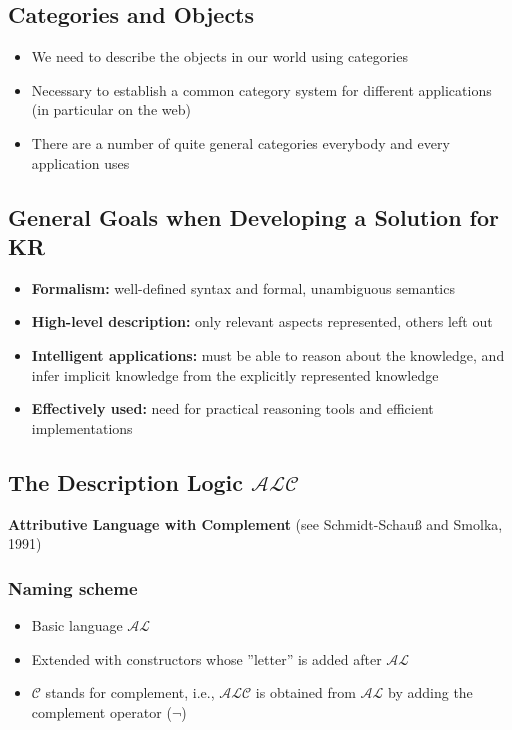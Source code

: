 \documentclass[conference, a4paper]{styles/acmsiggraph}
\begin{document}
    \subsection{Categories and Objects}
        \begin{itemize}
            \item We need to describe the objects in our world using categories
            \item Necessary to establish a common category system for different applications (in particular on the web)
            \item There are a number of quite general categories everybody and every application uses
        \end{itemize}
    
    \subsection{General Goals when Developing a Solution for KR}
        \begin{itemize}
            \item \textbf{Formalism:} well-defined syntax and formal, unambiguous semantics
            \item \textbf{High-level description:} only relevant aspects represented, others left out
            \item \textbf{Intelligent applications:} must be able to reason about the knowledge, and infer implicit knowledge from the explicitly represented knowledge
            \item \textbf{Effectively used:} need for practical reasoning tools and efficient implementations
        \end{itemize}
    
    
    
    
    
    
    \subsection{The Description Logic $\mathcal{ALC}$}
        \textbf{Attributive Language with Complement} (see Schmidt-Schauß and Smolka, 1991)
        \subsubsection{Naming scheme}
            \begin{itemize}
                \item Basic language $\mathcal{AL}$
                \item Extended with constructors whose ''letter'' is added after $\mathcal{AL}$
                \item $\mathcal{C}$ stands for complement, i.e., $\mathcal{ALC}$ is obtained from $\mathcal{AL}$ by adding the complement operator ($\lnot$)
            \end{itemize}
        
\end{document}

